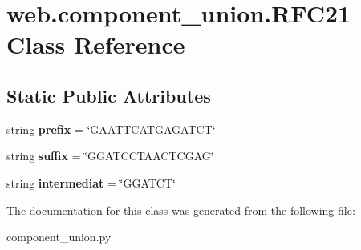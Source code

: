 \hypertarget{classweb_1_1component__union_1_1_r_f_c21}{\section{web.\-component\-\_\-union.\-R\-F\-C21 Class Reference}
\label{classweb_1_1component__union_1_1_r_f_c21}
}
\subsection*{Static Public Attributes}
\begin{DoxyCompactItemize}
\item 
\hypertarget{classweb_1_1component__union_1_1_r_f_c21_ad8cf78991352d8d2df4462d4911b0f08}{string {\bfseries prefix} = \char`\"{}G\-A\-A\-T\-T\-C\-A\-T\-G\-A\-G\-A\-T\-C\-T\char`\"{}}\label{classweb_1_1component__union_1_1_r_f_c21_ad8cf78991352d8d2df4462d4911b0f08}

\item 
\hypertarget{classweb_1_1component__union_1_1_r_f_c21_a17f59e8a9402a61bbe4e1943c74068fc}{string {\bfseries suffix} = \char`\"{}G\-G\-A\-T\-C\-C\-T\-A\-A\-C\-T\-C\-G\-A\-G\char`\"{}}\label{classweb_1_1component__union_1_1_r_f_c21_a17f59e8a9402a61bbe4e1943c74068fc}

\item 
\hypertarget{classweb_1_1component__union_1_1_r_f_c21_a64e75fe85791a49cae4b9daec3e0b61c}{string {\bfseries intermediat} = \char`\"{}G\-G\-A\-T\-C\-T\char`\"{}}\label{classweb_1_1component__union_1_1_r_f_c21_a64e75fe85791a49cae4b9daec3e0b61c}

\end{DoxyCompactItemize}


The documentation for this class was generated from the following file\-:\begin{DoxyCompactItemize}
\item 
component\-\_\-union.\-py\end{DoxyCompactItemize}
